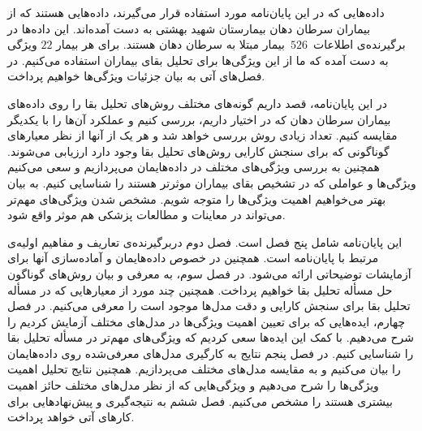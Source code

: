 
داده‌هایی که در این پایان‌نامه مورد استفاده قرار می‌گیرند، داده‌هایی هستند که از بیماران سرطان دهان بیمارستان شهید بهشتی به دست آمده‌اند.  این داده‌ها در برگیرنده‌ی اطلاعات~$526$~بیمار مبتلا به سرطان دهان هستند. برای هر بیمار $22$ ویژگی به دست آمده که ما از این ویژگی‌ها برای تحلیل بقای بیماران استفاده می‌کنیم. در فصل‌‌های آتی به بیان جزئیات ویژگی‌ها خواهیم پرداخت.


در این پایان‌نامه، قصد داریم گونه‌های مختلف روش‌های تحلیل بقا را روی داده‌های بیماران سرطان دهان که در اختیار داریم، بررسی کنیم و عملکرد آن‌ها را با یکدیگر مقایسه کنیم. تعداد زیادی روش بررسی خواهد شد و هر یک از آنها از نظر معیارهای گوناگونی که برای سنجش کارایی روش‌های تحلیل بقا وجود دارد ارزیابی می‌شوند. همچنین به بررسی ویژگی‌های مختلف در داده‌هایمان می‌پردازیم و سعی می‌کنیم ویژگی‌ها و عواملی که در تشخیص بقای بیماران موثرتر هستند را شناسایی کنیم. به بیان بهتر می‌خواهیم اهمیت ویژگی‌ها را متوجه شویم. مشخص شدن ویژگی‌های مهم‌تر می‌تواند در معاینات و مطالعات پزشکی هم موثر واقع شود.



این پایان‌نامه شامل پنج فصل است. 
فصل دوم دربرگیرنده‌ی تعاریف و مفاهیم اولیه‌ی مرتبط با پایان‌نامه است. همچنین در خصوص داده‌هایمان و آماده‌سازی آنها برای آزمایشات توضیحاتی ارائه می‌شود.
در فصل سوم، به معرفی و بیان روش‌های گوناگون حل مسأله تحلیل بقا خواهیم پرداخت. همچنین چند مورد از معیارهایی که در مسأله تحلیل بقا برای سنجش کارایی و دقت مدل‌ها موجود است را معرفی می‌کنیم.
در فصل چهارم، ایده‌هایی که برای تعیین اهمیت ویژگی‌ها در مدل‌های مختلف آزمایش کردیم را شرح می‌دهیم. با کمک این ایده‌ها سعی کردیم که ویژگی‌های مهم‌تر در مسأله تحلیل بقا را شناسایی کنیم.
در فصل پنجم نتایج به کارگیری مدل‌های معرفی‌شده روی داده‌هایمان را بیان می‌کنیم و به مقایسه مدل‌های مختلف می‌پردازیم. همچنین نتایج تحلیل اهمیت ویژگی‌ها را شرح می‌دهیم و ویژگی‌هایی که از نظر مدل‌های مختلف حائز اهمیت بیشتری هستند را مشخص می‌کنیم. 
فصل ششم به نتیجه‌گیری و پیش‌نهادهایی برای کارهای آتی خواهد پرداخت.

